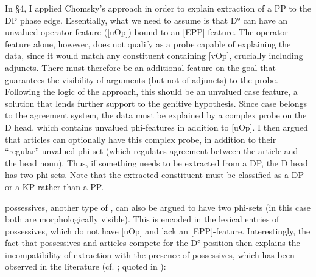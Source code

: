 \documentclass[output=paper]{langsci/langscibook}
\begin{document}
In §4, I applied Chomsky’s  approach in order to explain extraction of a PP to the DP phase edge. Essentially, what we need to assume is that D° can have an unvalued operator feature ([uOp]) bound to an [EPP]-feature. The operator feature alone, however, does not qualify as a probe capable of explaining the data, since it would match any constituent containing [vOp], crucially including adjuncts. There must therefore be an additional feature on the goal that guarantees the visibility of arguments (but not of adjuncts) to the probe. Following the logic of the  approach, this should be an unvalued case feature, a solution that lends further support to the genitive hypothesis. Since case belongs to the agreement system, the data must be explained by a complex probe on the D head, which contains unvalued phi-features in addition to [uOp]. I then argued that  articles can optionally have this complex probe, in addition to their “regular” unvalued phi-set (which regulates agreement between the article and the head noun). Thus, if something needs to be extracted from a DP, the D head has two phi-sets. Note that the extracted constituent must be classified as a DP or a KP rather than a PP.

 possessives, another type of , can also be argued to have two phi-sets (in this case both are morphologically visible). This is encoded in the lexical entries of possessives, which do not have [uOp] and lack an [EPP]-feature. Interestingly, the fact that possessives and articles compete for the D° position then explains the incompatibility of extraction with the presence of possessives, which has been observed in the literature (cf. \citealt{Milner1978,Milner1982}; quoted in \citealt{Sag1994}):

\ea%
    \label{ex:mensch:32}
    \z
\z
\end{document}
